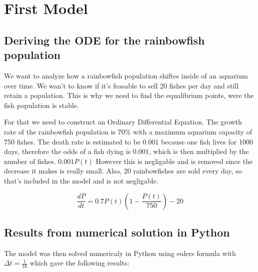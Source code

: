 \section{First Model}

\subsection{Deriving the ODE for the rainbowfish population}
\begin{flushleft}
    We want to analyze how a rainbowfish population shiftes inside
    of an aquarium over time. We wan't to know if it's feasable to
    sell 20 fishes per day and still retain a population. This is why
    we need to find the equalibrium points, were the fish population is
    stable.
\end{flushleft}


\begin{flushleft}
    For that we need to construct an Ordinary Differential Equation.
    The growth rate of the rainbowfish population is 70\% with
    a maximum aquarium capacity of 750 fishes. The death rate is
    estimated to be 0.001 because one fish lives for 1000
    days, therefore the odds of a fish dying is 0.001, which is then
    multiplied by the number of fishes. $0.001P(t)$
    However this is negligable and is
    removed since the decrease it makes is really small.
    Also, 20 rainbowfishes are sold every day,
    so that's included in the model and is not negligable.
\end{flushleft}

\begin{equation}
    \frac{dP}{dt} = 0.7P(t)(1-\frac{P(t)}{750})-20
\end{equation}

\subsection{Results from numerical solution in Python}
\begin{flushleft}

    The model was then solved numericaly in Python using
    eulers formula with $\Delta t=\frac{1}{16}$
    which gave the following results:

\end{flushleft}

